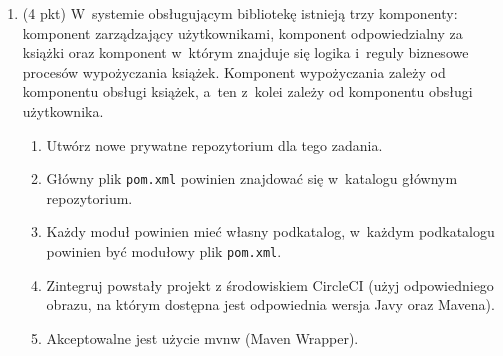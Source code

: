 \documentclass[12pt]{article}
\begin{document}
\begin{enumerate}
        \item\label{exc:maven}
            (4 pkt) W~systemie obsługującym bibliotekę istnieją trzy komponenty: komponent zarządzający użytkownikami, komponent odpowiedzialny za książki oraz komponent w~którym znajduje się logika i~reguly biznesowe procesów wypożyczania książek. Komponent wypożyczania zależy od komponentu obsługi książek, a~ten z~kolei zależy od komponentu obsługi użytkownika.
            \begin{enumerate}
                \item Utwórz nowe prywatne repozytorium dla tego zadania.
                \item Główny plik \texttt{pom.xml} powinien znajdować się w~katalogu głównym repozytorium.
                \item Każdy moduł powinien mieć własny podkatalog, w~każdym podkatalogu powinien być modułowy plik \texttt{pom.xml}.
                \item Zintegruj powstały projekt z środowiskiem CircleCI (użyj odpowiedniego obrazu, na którym dostępna jest odpowiednia wersja Javy oraz Mavena).
                \item Akceptowalne jest użycie mvnw (Maven Wrapper).
            \end{enumerate}

    \end{enumerate}
\end{document}
